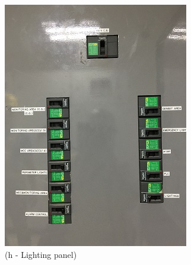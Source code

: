 \begin{figure}
\begin{minipage}[b]{0.22\linewidth}
	\includegraphics[width=\textwidth]{figures/R1P_visual/lightingpanel}
	\caption*{(h - Lighting panel)}
\end{minipage}
	\hspace{0.03cm}
\begin{minipage}[b]{0.22\linewidth}

\end{minipage}
\end{figure}
